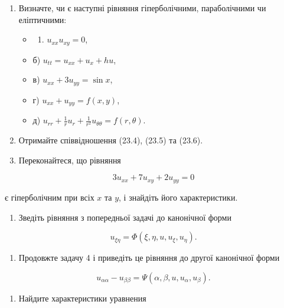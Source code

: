 \documentclass[
  ukrainian,
]{article}
\providecommand{\tightlist}{%
  \setlength{\itemsep}{0pt}\setlength{\parskip}{0pt}}
\begin{document}
\begin{enumerate}
\def\labelenumi{\arabic{enumi}.}
\item
  Визначте, чи є наступні рівняння гіперболічними, параболічними чи
  еліптичними:

  \begin{itemize}
  \tightlist
  \item
    \begin{enumerate}
    \def\labelenumii{\alph{enumii})}
    \tightlist
    \item
      \(u_{xx}u_{xy}=0\),
    \end{enumerate}
  \item
    б) \(u_{tt}=u_{xx}+u_x+hu\),
  \item
    в) \(u_{xx}+3u_{yy}=\sin x\),
  \item
    г) \(u_{xx}+u_{yy}=f(x,y)\),
  \item
    д)
    \(u_{rr}+\frac{1}{r}u_r+\frac{1}{r^2}u_{\theta\theta}=f(r,\theta)\).
  \end{itemize}
\item
  Отримайте співвідношення (23.4), (23.5) та (23.6).
\item
  Переконайтеся, що рівняння
\end{enumerate}

\[
3u_{xx} + 7u_{xy} + 2u_{yy} = 0
\]

є гіперболічним при всіх \(x\) та \(y\), і знайдіть його характеристики.

\begin{enumerate}
\def\labelenumi{\arabic{enumi}.}
\setcounter{enumi}{3}
\tightlist
\item
  Зведіть рівняння з попередньої задачі до канонічної форми
\end{enumerate}

\[
u_{\xi\eta} = \Phi(\xi, \eta, u, u_{\xi}, u_{\eta}).
\]

\begin{enumerate}
\def\labelenumi{\arabic{enumi}.}
\setcounter{enumi}{4}
\tightlist
\item
  Продовжте задачу 4 і приведіть це рівняння до другої канонічної форми
\end{enumerate}

\[
u_{\alpha\alpha} - u_{\beta\beta} = \Psi(\alpha, \beta, u, u_{\alpha}, u_{\beta}).
\]

\begin{enumerate}
\def\labelenumi{\arabic{enumi}.}
\setcounter{enumi}{5}
\tightlist
\item
  Найдите характеристики уравнения
\end{enumerate}
\end{document}
